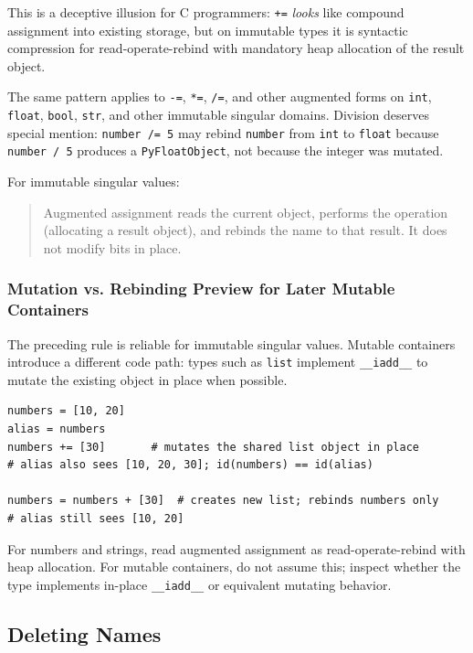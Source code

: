 \documentclass[a4paper,twoside]{report}
\begin{document}
This is a deceptive illusion for C programmers: \texttt{+=} \emph{looks} like compound assignment into existing storage, but on immutable types it is syntactic compression for read-operate-rebind with mandatory heap allocation of the result object.

The same pattern applies to \texttt{-=}, \texttt{*=}, \texttt{/=}, and other augmented forms on \texttt{int}, \texttt{float}, \texttt{bool}, \texttt{str}, and other immutable singular domains. Division deserves special mention: \texttt{number /= 5} may rebind \texttt{number} from \texttt{int} to \texttt{float} because \texttt{number / 5} produces a \texttt{PyFloatObject}, not because the integer was mutated.

For immutable singular values:

\begin{quote}
Augmented assignment reads the current object, performs the operation (allocating a result object), and rebinds the name to that result. It does not modify bits in place.
\end{quote}

\subsubsection{Mutation vs. Rebinding Preview for Later Mutable Containers}

The preceding rule is reliable for immutable singular values. Mutable containers introduce a different code path: types such as \texttt{list} implement \texttt{\_\_iadd\_\_} to mutate the existing object in place when possible.

\begin{verbatim}
numbers = [10, 20]
alias = numbers
numbers += [30]       # mutates the shared list object in place
# alias also sees [10, 20, 30]; id(numbers) == id(alias)

numbers = numbers + [30]  # creates new list; rebinds numbers only
# alias still sees [10, 20]
\end{verbatim}

For numbers and strings, read augmented assignment as read-operate-rebind with heap allocation. For mutable containers, do not assume this; inspect whether the type implements in-place \texttt{\_\_iadd\_\_} or equivalent mutating behavior.


\subsection{Deleting Names}
\end{document}
